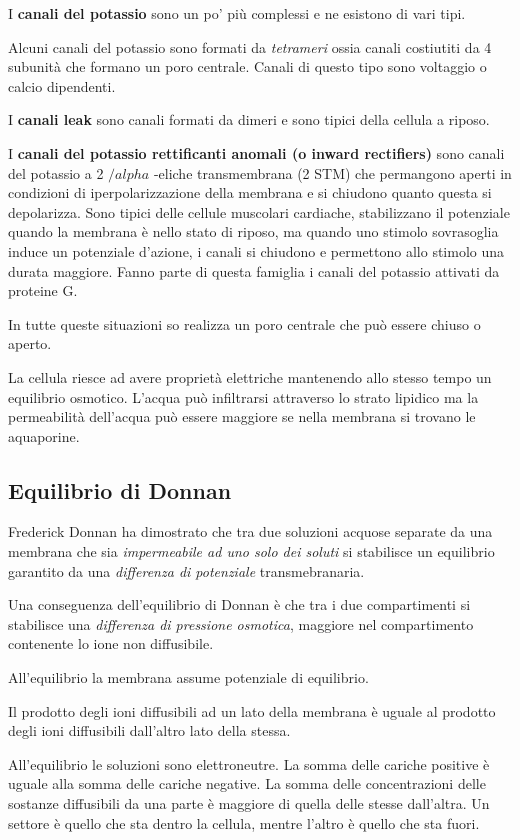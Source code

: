 \documentclass[]{article}
\begin{document}
I \textbf{canali del potassio} sono un po' più complessi e ne esistono
di vari tipi.

Alcuni canali del potassio sono formati da \emph{tetrameri} ossia canali
costiutiti da 4 subunità che formano un poro centrale. Canali di questo
tipo sono voltaggio o calcio dipendenti.

I \textbf{canali leak} sono canali formati da dimeri e sono tipici della
cellula a riposo.

I \textbf{canali del potassio rettificanti anomali (o inward
rectifiers)} sono canali del potassio a 2 \(/alpha\) -eliche
transmembrana (2 STM) che permangono aperti in condizioni di
iperpolarizzazione della membrana e si chiudono quanto questa si
depolarizza. Sono tipici delle cellule muscolari cardiache, stabilizzano
il potenziale quando la membrana è nello stato di riposo, ma quando uno
stimolo sovrasoglia induce un potenziale d'azione, i canali si chiudono
e permettono allo stimolo una durata maggiore. Fanno parte di questa
famiglia i canali del potassio attivati da proteine G.

In tutte queste situazioni so realizza un poro centrale che può essere
chiuso o aperto.

La cellula riesce ad avere proprietà elettriche mantenendo allo stesso
tempo un equilibrio osmotico. L'acqua può infiltrarsi attraverso lo
strato lipidico ma la permeabilità dell'acqua può essere maggiore se
nella membrana si trovano le aquaporine.

\subsection{Equilibrio di Donnan}\label{equilibrio-di-donnan}

Frederick Donnan ha dimostrato che tra due soluzioni acquose separate da
una membrana che sia \emph{impermeabile ad uno solo dei soluti} si
stabilisce un equilibrio garantito da una \emph{differenza di
potenziale} transmebranaria.

Una conseguenza dell'equilibrio di Donnan è che tra i due compartimenti
si stabilisce una \emph{differenza di pressione osmotica}, maggiore nel
compartimento contenente lo ione non diffusibile.

All'equilibrio la membrana assume potenziale di equilibrio.

Il prodotto degli ioni diffusibili ad un lato della membrana è uguale al
prodotto degli ioni diffusibili dall'altro lato della stessa.

All'equilibrio le soluzioni sono elettroneutre. La somma delle cariche
positive è uguale alla somma delle cariche negative. La somma delle
concentrazioni delle sostanze diffusibili da una parte è maggiore di
quella delle stesse dall'altra. Un settore è quello che sta dentro la
cellula, mentre l'altro è quello che sta fuori.
\end{document}
